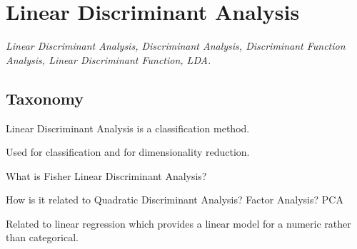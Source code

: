 
\section{Linear Discriminant Analysis} 
\label{sec:lda}

\emph{Linear Discriminant Analysis, Discriminant Analysis, Discriminant Function Analysis, Linear Discriminant Function, LDA.}

\subsection{Taxonomy}
Linear Discriminant Analysis is a classification method.

Used for classification and for dimensionality reduction.

What is Fisher Linear Discriminant Analysis?

How is it related to Quadratic Discriminant Analysis?
Factor Analysis?
PCA

Related to linear regression which provides a linear model for a numeric rather than categorical.


